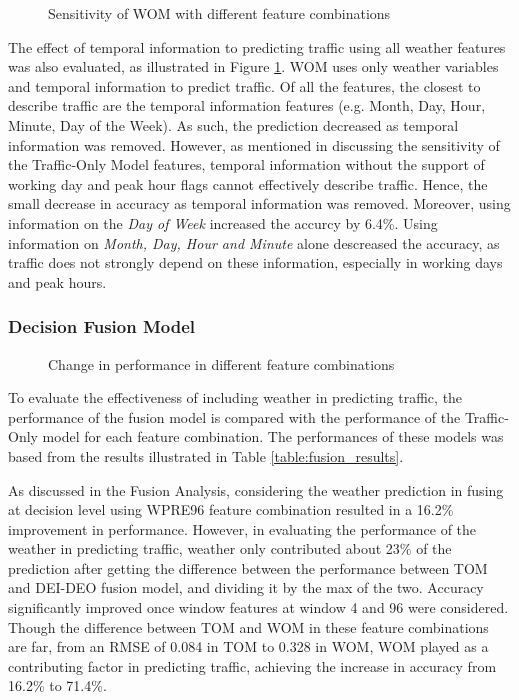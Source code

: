 \begin{figure}[!t]
  \centering
  \captionsetup{justification=centering}
  \caption{Sensitivity of WOM with different feature combinations}
  \label{fig:WOM_sensitivity}
\end{figure}

The effect of temporal information to predicting traffic using all weather features was also evaluated, as illustrated in Figure \ref{fig:WOM_sensitivity}. WOM uses only weather variables and temporal information to predict traffic. Of all the features, the closest to describe traffic are the temporal information features (e.g. Month, Day, Hour, Minute, Day of the Week). As such, the prediction decreased as temporal information was removed. However, as mentioned in discussing the sensitivity of the Traffic-Only Model features, temporal information without the support of working day and peak hour flags cannot effectively describe traffic. Hence, the small decrease in accuracy as temporal information was removed. Moreover, using information on the \textit{Day of Week} increased the accurcy by 6.4\%. Using information on \textit{Month, Day, Hour and Minute} alone descreased the accuracy, as traffic does not strongly depend on these information, especially in working days and peak hours. 


\subsubsection{Decision Fusion Model}

\begin{figure}[!t]
  \centering
  \captionsetup{justification=centering}
  \caption{Change in performance in different feature combinations}
  \label{fig:pm1-pm2-df-changes}
\end{figure}

To evaluate the effectiveness of including weather in predicting traffic, the performance of the fusion model is compared with the performance of the Traffic-Only model for each feature combination. The performances of these models was based from the results illustrated in Table \ref{table:fusion_results}. 

As discussed in the Fusion Analysis, considering the weather prediction in fusing at decision level using WPRE96 feature combination resulted in a 16.2\% improvement in performance. However, in evaluating the performance of the weather in predicting traffic, weather only contributed about 23\% of the prediction after getting the difference between the performance between TOM and DEI-DEO fusion model, and dividing it by the max of the two. Accuracy significantly improved once window features at window 4 and 96 were considered. Though the difference between TOM and WOM in these feature combinations are far, from an RMSE of 0.084 in TOM to 0.328 in WOM, WOM played as a contributing factor in predicting traffic, achieving the increase in accuracy from 16.2\% to 71.4\%. 


